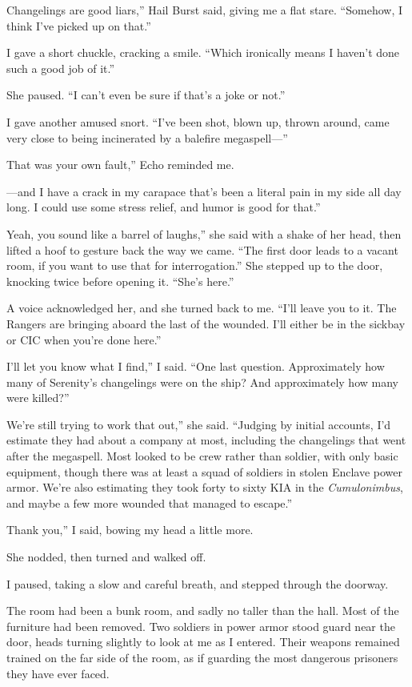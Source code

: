 \leavevmode{}Changelings are good liars,” Hail Burst said, giving me a flat stare. “Somehow, I think I’ve picked up on that.”

I gave a short chuckle, cracking a smile. “Which ironically means I haven’t done such a good job of it.”

She paused. “I can’t even be sure if that’s a joke or not.”

I gave another amused snort. “I’ve been shot, blown up, thrown around, came very close to being incinerated by a balefire megaspell—”

\leavevmode{}That was your own fault,” Echo reminded me.

\leavevmode{}—and I have a crack in my carapace that’s been a literal pain in my side all day long. I could use some stress relief, and humor is good for that.”

\leavevmode{}Yeah, you sound like a barrel of laughs,” she said with a shake of her head, then lifted a hoof to gesture back the way we came. “The first door leads to a vacant room, if you want to use that for interrogation.” She stepped up to the door, knocking twice before opening it. “She’s here.”

A voice acknowledged her, and she turned back to me. “I’ll leave you to it. The Rangers are bringing aboard the last of the wounded. I’ll either be in the sickbay or CIC when you’re done here.”

\leavevmode{}I’ll let you know what I find,” I said. “One last question. Approximately how many of Serenity’s changelings were on the ship? And approximately how many were killed?”

\leavevmode{}We’re still trying to work that out,” she said. “Judging by initial accounts, I’d estimate they had about a company at most, including the changelings that went after the megaspell. Most looked to be crew rather than soldier, with only basic equipment, though there was at least a squad of soldiers in stolen Enclave power armor. We’re also estimating they took forty to sixty KIA in the \textit{Cumulonimbus}, and maybe a few more wounded that managed to escape.”

\leavevmode{}Thank you,” I said, bowing my head a little more.

She nodded, then turned and walked off.

I paused, taking a slow and careful breath, and stepped through the doorway.

The room had been a bunk room, and sadly no taller than the hall. Most of the furniture had been removed. Two soldiers in power armor stood guard near the door, heads turning slightly to look at me as I entered. Their weapons remained trained on the far side of the room, as if guarding the most dangerous prisoners they have ever faced.

